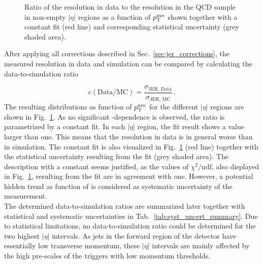 \begin{figure}[!htp]
\begin{tabular}{cc}
  \end{tabular}
  \caption{Ratio of the resolution in data to the resolution in the \pythia QCD sample in non-empty $|\eta|$ regions as a function of $p_{\text{T}}^\mathrm{ave}$ shown together with a constant fit (red line) and corresponding statistical uncertainty (grey shaded area).}
  \label{fig:ratio}
\end{figure}
After applying all corrections described in Sec.~\ref{sec:jer_corrections}, the measured resolution in data and simulation can be compared by calculating the data-to-simulation ratio

\begin{equation}
  c(\mathrm{Data}/\mathrm{MC}) = \frac{ \sigma_\mathrm{JER,\, Data}}{ \sigma_\mathrm{JER,\, MC}} \, .
 \end{equation}
The resulting distributions as function of $p_{\text{T}}^\mathrm{ave}$ for the different $|\eta|$ regions are shown in Fig.~\ref{fig:ratio}. As no significant \pt-dependence is observed, the ratio is parametrized by a constant fit. In each $|\eta|$ region, the fit result shows a value larger than one. This means that the resolution in data is in general worse than in simulation. The constant fit is also visualized in Fig.~\ref{fig:ratio} (red line) together with the statistical uncertainty resulting from the fit (grey shaded area). The description with a constant seems justified, as the values of $\chi^2/\mathrm{ndf}$, also displayed in Fig.~\ref{fig:ratio}, resulting from the fit are in agreement with one. However, a potential hidden trend as function of \ptave is considered as systematic uncertainty of the measurement. \\
The determined data-to-simulation ratios are summarized later together with statistical and systematic uncertainties in Tab.~\ref{tab:syst_uncert_summary}. Due to statistical limitations, no data-to-simulation ratio could be determined for the two highest $|\eta|$ intervals. As jets in the forward region of the detector have essentially low transverse momentum, these $|\eta|$ intervals are mainly affected by the high pre-scales of the triggers with low momentum thresholds.   
 
